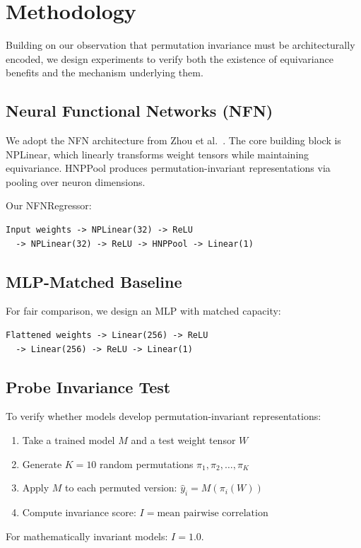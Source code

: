 \section{Methodology}

Building on our observation that permutation invariance must be architecturally encoded, we design experiments to verify both the existence of equivariance benefits and the mechanism underlying them.

\subsection{Neural Functional Networks (NFN)}

We adopt the NFN architecture from Zhou et al.~\cite{zhou2023neural}. The core building block is NPLinear, which linearly transforms weight tensors while maintaining equivariance. HNPPool produces permutation-invariant representations via pooling over neuron dimensions.

Our NFNRegressor:
\begin{verbatim}
Input weights -> NPLinear(32) -> ReLU
  -> NPLinear(32) -> ReLU -> HNPPool -> Linear(1)
\end{verbatim}

\subsection{MLP-Matched Baseline}

For fair comparison, we design an MLP with matched capacity:
\begin{verbatim}
Flattened weights -> Linear(256) -> ReLU
  -> Linear(256) -> ReLU -> Linear(1)
\end{verbatim}

\subsection{Probe Invariance Test}

To verify whether models develop permutation-invariant representations:

\begin{enumerate}
    \item Take a trained model $M$ and a test weight tensor $W$
    \item Generate $K=10$ random permutations $\pi_1, \pi_2, \ldots, \pi_K$
    \item Apply $M$ to each permuted version: $\hat{y}_i = M(\pi_i(W))$
    \item Compute invariance score: $I = \text{mean pairwise correlation}$
\end{enumerate}

For mathematically invariant models: $I = 1.0$.
